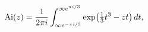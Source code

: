 \[\mathop{\mathrm{Ai}\/}\nolimits\!\left(z\right)=\frac{1}{2\pi i}\int_{\infty e%
^{-\pi i/3}}^{\infty e^{\pi i/3}}\mathop{\exp\/}\nolimits\!\left(\tfrac{1}{3}t%
^{3}-zt\right)dt,\]